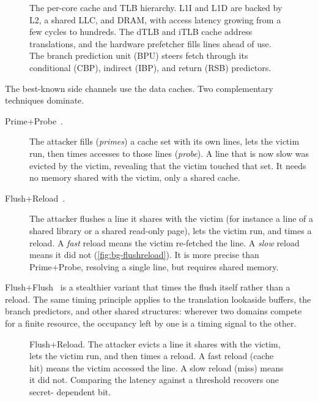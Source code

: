 \begin{figure}[t]
\centering
\fitwidth{}
\caption{The per-core cache and TLB hierarchy. L1I and L1D are backed by L2, a shared LLC, and DRAM,
with access latency growing from a few cycles to hundreds. The dTLB and iTLB cache address
translations, and the hardware prefetcher fills lines ahead of use. The branch prediction unit (BPU)
steers fetch through its conditional (CBP), indirect (IBP), and return (RSB) predictors.}
\label{fig:bg-hierarchy}
\end{figure}

The best-known side channels use the data caches. Two complementary techniques dominate.
\begin{description}
  \item[Prime+Probe~\cite{primeprobe}.] The attacker fills (\emph{primes}) a cache set with its
    own lines, lets the victim run, then times accesses to those lines (\emph{probe}). A line that
    is now slow was evicted by the victim, revealing that the victim touched that set. It needs no
    memory shared with the victim, only a shared cache.
  \item[Flush+Reload~\cite{flushreload}.] The attacker flushes a line it shares with the victim
    (for instance a line of a shared library or a shared read-only page), lets the victim run, and
    times a reload. A \emph{fast} reload means the victim re-fetched the line. A \emph{slow} reload
    means it did not (\autoref{fig:bg-flushreload}). It is more precise than Prime+Probe, resolving
    a single line, but requires shared memory.
\end{description}
Flush+Flush~\cite{flushflush} is a stealthier variant that times the flush itself rather than a
reload. The same timing principle applies to the translation lookaside buffers, the branch
predictors, and other shared structures: wherever two domains compete for a finite resource, the
occupancy left by one is a timing signal to the other.

\begin{figure}[t]
\centering
\fitwidth{}
\caption{Flush+Reload. The attacker evicts a line it shares with the victim, lets the victim run,
and then times a reload. A fast reload (cache hit) means the victim accessed the line. A slow
reload (miss) means it did not. Comparing the latency against a threshold recovers one secret-%
dependent bit.}
\label{fig:bg-flushreload}
\end{figure}

